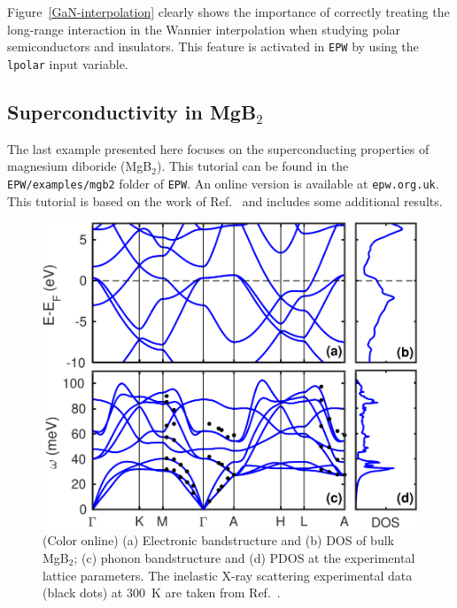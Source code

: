 \documentclass[final,3p,times,twocolumn]{elsarticle}
\newcounter{bla}
\begin{document}
Figure~\ref{GaN-interpolation} clearly shows the importance of correctly treating the long-range interaction in the Wannier interpolation when studying polar semiconductors and insulators. This feature is activated in \texttt{EPW} by using the \texttt{lpolar} input variable. 




\subsection{Superconductivity in MgB$_2$}

The last example presented here focuses on the superconducting properties of magnesium diboride (MgB$_2$). This tutorial can be found in the \texttt{EPW/examples/mgb2} folder of \texttt{EPW}. An online version is available at \texttt{epw.org.uk}. 
This tutorial is based on the work of Ref.~\cite{Margine2013} and includes some additional results. 

\begin{figure}[b!]
  \centering
  \includegraphics[width=0.99\linewidth]{MgB2_BS.pdf}
  \caption{\label{PH-MgB2} (Color online) (a) Electronic bandstructure and (b) DOS of bulk MgB$_2$; (c) phonon bandstructure and (d) PDOS at the experimental lattice parameters. The inelastic X-ray scattering experimental data (black dots) at 300~K are taken from Ref.~\cite{Shukla2003}.  }
\end{figure}
\end{document}
